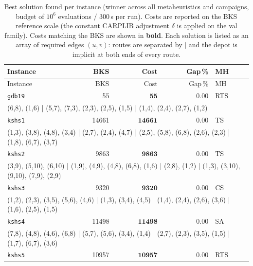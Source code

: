 \begingroup\scriptsize
\begin{longtable}{lrrrl}
\caption{Best solution found per instance (winner across all metaheuristics and campaigns, budget of $10^6$ evaluations / 300\,s per run). Costs are reported on the BKS reference scale (the constant CARPLIB adjustment $\delta$ is applied on the val family). Costs matching the BKS are shown in \textbf{bold}. Each solution is listed as an array of required edges $(u,v)$: routes are separated by $|$ and the depot is implicit at both ends of every route.}\label{tab:best-solutions-per-instance}\\
\toprule
Instance & BKS & Cost & Gap\,\% & MH \\
\midrule
\endfirsthead
\toprule
Instance & BKS & Cost & Gap\,\% & MH \\
\midrule
\endhead
\bottomrule
\endfoot
\texttt{gdb19} & 55 & $\mathbf{55}$ & 0.00 & RTS \\
\multicolumn{5}{p{0.96\linewidth}}{\tiny\raggedright\arraybackslash (6,8), (1,6) | (5,7), (7,3), (2,3), (2,5), (1,5) | (1,4), (2,4), (2,7), (1,2)} \\[2pt]
\texttt{kshs1} & 14661 & $\mathbf{14661}$ & 0.00 & TS \\
\multicolumn{5}{p{0.96\linewidth}}{\tiny\raggedright\arraybackslash (1,3), (3,8), (4,8), (3,4) | (2,7), (2,4), (4,7) | (2,5), (5,8), (6,8), (2,6), (2,3) | (1,8), (6,7), (3,7)} \\[2pt]
\texttt{kshs2} & 9863 & $\mathbf{9863}$ & 0.00 & TS \\
\multicolumn{5}{p{0.96\linewidth}}{\tiny\raggedright\arraybackslash (3,9), (5,10), (6,10) | (1,9), (4,9), (4,8), (6,8), (1,6) | (2,8), (1,2) | (1,3), (3,10), (9,10), (7,9), (2,9)} \\[2pt]
\texttt{kshs3} & 9320 & $\mathbf{9320}$ & 0.00 & CS \\
\multicolumn{5}{p{0.96\linewidth}}{\tiny\raggedright\arraybackslash (1,2), (2,3), (3,5), (5,6), (4,6) | (1,3), (3,4), (4,5) | (1,4), (2,4), (2,6), (3,6) | (1,6), (2,5), (1,5)} \\[2pt]
\texttt{kshs4} & 11498 & $\mathbf{11498}$ & 0.00 & SA \\
\multicolumn{5}{p{0.96\linewidth}}{\tiny\raggedright\arraybackslash (7,8), (4,8), (4,6), (6,8) | (5,7), (5,6), (3,4), (1,4) | (2,7), (2,3), (3,5), (1,5) | (1,7), (6,7), (3,6)} \\[2pt]
\texttt{kshs5} & 10957 & $\mathbf{10957}$ & 0.00 & RTS \\

\end{longtable}

